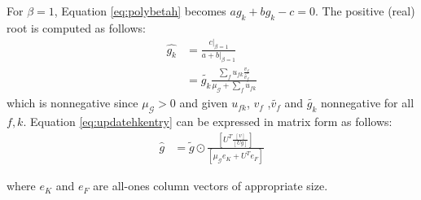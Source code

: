 \documentclass[a4paper, 11pt]{article}
\begin{document}
For $\beta=1$, Equation \eqref{eq:polybetah} becomes $a g_k + b g_k - c  = 0$. The positive (real) root is computed as follows:
\begin{equation}\label{eq:updatehkentry}
    \begin{aligned}
       \hat{g_{k}} & =\frac{\left.c\right|_{\beta=1}}{a+\left.b\right|_{\beta=1}} \\
                   & = \tilde{g_{k}}\frac{\sum_f u_{fk}   \frac{v_f}{\tilde{v_{f}}} }{\mu_{\mathcal{G}}+\sum_f u_{fk}}
    \end{aligned}
\end{equation}
which is nonnegative since $\mu_{\mathcal{G}} > 0$ and given $u_{fk}$, $v_{f}$ ,$\tilde{v_{f}}$ and $\tilde{g_{k}}$ nonnegative for all $f,k$.  Equation \eqref{eq:updatehkentry} can be expressed in matrix form as follows:
\begin{equation}\label{eq:updateH}
    \begin{aligned}
       \hat{g}&=\tilde{g} \odot \frac{[U^T \frac{[ v ]}{[Ug]}]}{[\mu_{\mathcal{G}}e_K+U^Te_F]}
    \end{aligned}
\end{equation}

where $e_K$ and $e_F$ are all-ones column vectors of appropriate size.
\end{document}
